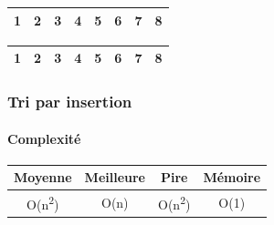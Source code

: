 \begin{frame}
\begin{table}
\begin{tabular}{| c | c | c | c | c | c | c | c |}
\hline
\end{tabular}
\end{table}
\begin{table}
\begin{tabular}{| c | c | c | c | c | c | c | c |}
\hline
\cellcolor{blue!25}1 & \cellcolor{blue!25}2 & \cellcolor{blue!25}3 & \cellcolor{red!25}4 & \cellcolor{blue!25}5 & \cellcolor{blue!25}6 & \cellcolor{blue!25}7 & \cellcolor{blue!25}8 \\ 
\hline
\end{tabular}
\end{table}
\begin{table}
\begin{tabular}{| c | c | c | c | c | c | c | c |}
\hline
\cellcolor{blue!25}1 & \cellcolor{blue!25}2 & \cellcolor{blue!25}3 & \cellcolor{blue!25}4 & \cellcolor{blue!25}5 & \cellcolor{blue!25}6 & \cellcolor{blue!25}7 & \cellcolor{blue!25}8 \\ 
\hline
\end{tabular}
\end{table}
\end{frame}

\begin{frame}
\frametitle{Tri par insertion}
\framesubtitle{Complexité}
\begin{table}
\begin{tabular}{| c | c | c | c |}
\hline
Moyenne & Meilleure & Pire & Mémoire\\ 
\hline
O(n\textsuperscript{2}) & O(n) & O(n\textsuperscript{2}) & O(1)\\
\hline
\end{tabular}
\end{table}
\end{frame}